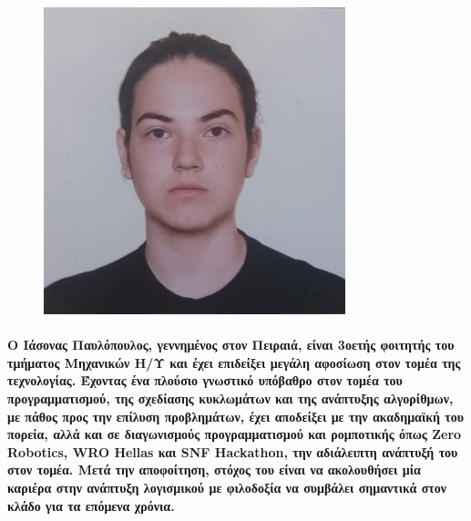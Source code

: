 \documentclass[12pt, A4]{article}
\newcommand{\tl}{\textlatin}
\begin{document}
    \begin{figure}
	\includegraphics[width=\linewidth]{Bio/bio1.jpg}
    \end{figure}
    
    \paragraph{Ο Ιάσονας Παυλόπουλος, γεννημένος στον Πειραιά, είναι 3οετής φοιτητής του τμήματος Μηχανικών Η/Υ και έχει επιδείξει μεγάλη αφοσίωση στον τομέα της τεχνολογίας. Έχοντας ένα πλούσιο γνωστικό υπόβαθρο στον τομέα του προγραμματισμού, της σχεδίασης κυκλωμάτων και της ανάπτυξης αλγορίθμων, με πάθος προς την επίλυση προβλημάτων, έχει αποδείξει με την ακαδημαϊκή του πορεία, αλλά και σε διαγωνισμούς προγραμματισμού και ρομποτικής όπως \tl{Zero Robotics}, \tl{WRO Hellas} και \tl{SNF Hackathon}, την αδιάλειπτη ανάπτυξή του στον τομέα. Μετά την αποφοίτηση, στόχος του είναι να ακολουθήσει μία καριέρα στην ανάπτυξη λογισμικού με φιλοδοξία να συμβάλει σημαντικά στον κλάδο για τα επόμενα χρόνια.}
    
\end{document}

